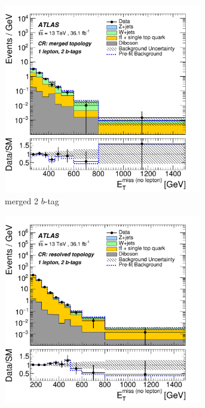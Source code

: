 \begin{figure}[htbp]
\begin{subfigure}{0.45\textwidth}
    \centering
    \includegraphics[width=0.95\textwidth]{figures/monoV/results/figaux_08e.pdf}
    \caption{merged 2 \(b\)-tag}
  \end{subfigure}
    \begin{subfigure}{0.45\textwidth}
    \centering
    \includegraphics[width=0.95\textwidth]{figures/monoV/results/figaux_08f.pdf}

\end{subfigure}
\end{figure}
